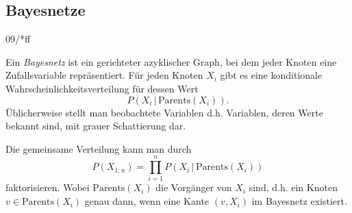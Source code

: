 \documentclass[ngerman]{../LaTeX-Templates/Paper/paper}
\begin{document}
\subsection{Bayesnetze}
09/*ff



\begin{definition}[Bayesnetz]
	Ein \emph{Bayesnetz} ist ein gerichteter azyklischer Graph, bei dem jeder Knoten eine Zufallsvariable repräsentiert. Für jeden Knoten $X_i$ gibt es eine konditionale Wahrscheinlichkeitsverteilung für dessen Wert
	\begin{equation*}
		P(X_i\,|\,\mathrm{Parents}(X_i)).
	\end{equation*}
	Üblicherweise stellt man beobachtete Variablen d.h. Variablen, deren Werte bekannt sind, mit grauer Schattierung dar.
\end{definition}
Die gemeinsame Verteilung kann man durch
\begin{equation*}
	P(X_{1:n})=\prod_{i=1}^nP(X_i\,|\,\mathrm{Parents}(X_i))
\end{equation*}
faktorisieren. Wobei $\mathrm{Parents}(X_i)$ die Vorgänger von $X_i$ sind, d.h. ein Knoten $v\in\mathrm{Parents}(X_i)$ genau dann, wenn eine Kante $(v,X_i)$ im Bayesnetz existiert.
\end{document}
